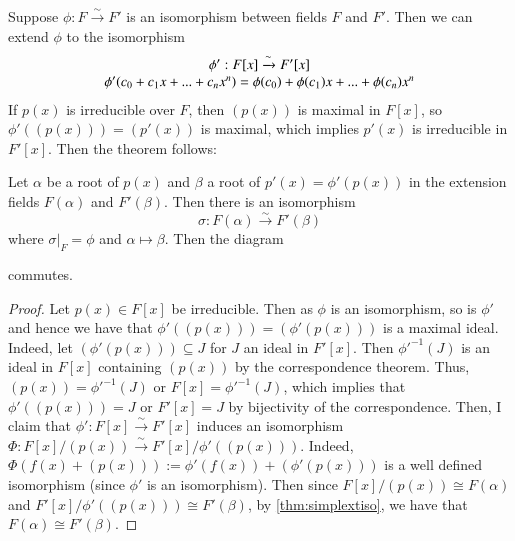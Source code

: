 \begin{remark}
    Suppose $\phi:F\xrightarrow{\sim} F'$ is an isomorphism between fields $F$ and $F'$. Then we can extend $\phi$ to the isomorphism \begin{equation}
        \begin{array}{c} \phi':F[x]\xrightarrow{\sim}{F'[x]} \\ \phi'(c_0+c_1x+...+c_nx^n) = \phi(c_0)+\phi(c_1)x+...+\phi(c_n)x^n \end{array}
    \end{equation}
    If $p(x)$ is irreducible over $F$, then $(p(x))$ is maximal in $F[x]$, so $\phi'((p(x))) = (p'(x))$ is maximal, which implies $p'(x)$ is irreducible in $F'[x]$. Then the theorem follows:
\end{remark}


\begin{theorem}
    Let $\alpha$ be a root of $p(x)$ and $\beta$ a root of $p'(x) = \phi'(p(x))$ in the extension fields $F(\alpha)$ and $F'(\beta)$. Then there is an isomorphism \begin{equation}
        \sigma:F(\alpha)\xrightarrow{\sim}F'(\beta)
    \end{equation}
    where $\sigma\rvert_F = \phi$ and $\alpha \mapsto \beta$. Then the diagram
        \begin{center}
        \end{center}
    commutes.
\end{theorem}
\begin{proof}
    Let $p(x) \in F[x]$ be irreducible. Then as $\phi$ is an isomorphism, so is $\phi'$ and hence we have that $\phi'((p(x))) = (\phi'(p(x)))$ is a maximal ideal. Indeed, let $(\phi'(p(x))) \subseteq J$ for $J$ an ideal in $F'[x]$. Then ${\phi'}^{-1}(J)$ is an ideal in $F[x]$ containing $(p(x))$ by the correspondence theorem. Thus, $(p(x)) = {\phi'}^{-1}(J)$ or $F[x] = {\phi'}^{-1}(J)$, which implies that $\phi'((p(x))) = J$ or $F'[x] = J$ by bijectivity of the correspondence. Then, I claim that $\phi':F[x]\xrightarrow{\sim}F'[x]$ induces an isomorphism $\Phi:F[x]/(p(x))\xrightarrow{\sim}F'[x]/\phi'((p(x)))$. Indeed, $\Phi(f(x)+(p(x))) := \phi'(f(x))+(\phi'(p(x)))$ is a well defined isomorphism (since $\phi'$ is an isomorphism). Then since $F[x]/(p(x)) \cong F(\alpha)$ and $F'[x]/\phi'((p(x))) \cong F'(\beta)$, by \ref{thm:simplextiso}, we have that $F(\alpha) \cong F'(\beta)$.
\end{proof}



